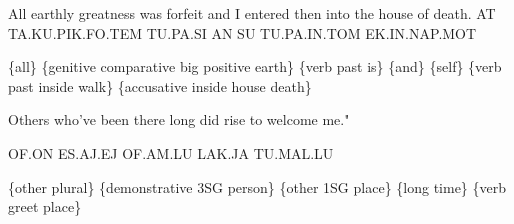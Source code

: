 {{ 
 

All earthly greatness was forfeit and I entered then into the house of death.  
 AT TA.KU.PIK.FO.TEM TU.PA.SI AN SU TU.PA.IN.TOM EK.IN.NAP.MOT 

\{all\} \{genitive comparative big positive earth\} \{verb past is\} \{and\} \{self\} \{verb past inside walk\} \{accusative inside house death\} 

 
 

Others who’ve been there long did rise to welcome me." 

OF.ON ES.AJ.EJ OF.AM.LU LAK.JA TU.MAL.LU 

\{other plural\} \{demonstrative 3SG person\} \{other 1SG place\} \{long time\} \{verb greet place\} 



}
}
